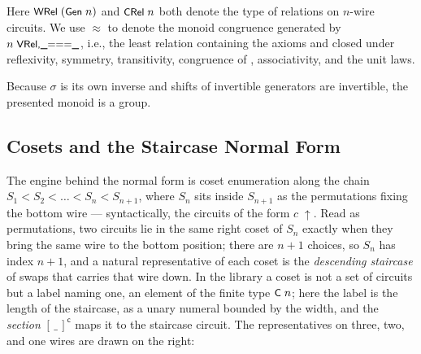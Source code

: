 Here $\mbox{\textsf{\small WRel}}\;(\mbox{\textsf{\small Gen}}\;n)$ and $\mbox{\textsf{\small CRel}}\;n$ both denote the
type of relations on $n$-wire circuits.
We use $\approx$ to denote the monoid congruence generated by
$n\;\mbox{\textsf{\small VRel,{\_}==={\_}}}$, i.e., the least relation containing the
axioms and closed under reflexivity, symmetry, transitivity,
congruence of , associativity, and the unit laws.

\iffalse

Because $\sigma$ is its own inverse and shifts of invertible
generators are invertible, the presented monoid is a group.

\subsection{Cosets and the Staircase Normal Form}\label{app:sn-cosets}

The engine behind the normal form is coset enumeration along the chain
$S_1 < S_2 < \dots < S_n < S_{n+1}$, where $S_n$ sits inside $S_{n+1}$ as
the permutations fixing the bottom wire --- syntactically, the circuits
of the form $c\;{\uparrow}$.  Read as permutations, two circuits lie in the
same right coset of $S_n$ exactly when they bring the same wire to the
bottom position; there are $n{+}1$ choices, so $S_n$ has index $n{+}1$,
and a natural representative of each coset is the \emph{descending
staircase} of swaps that carries that wire down.  In the library a coset
is not a set of circuits but a label naming one, an element of the finite type
$\mbox{\textsf{\small C}}\;n$; here the label is the length of the staircase, as a unary
numeral bounded by the width, and the \emph{section} $[\,\_\,]^{\mathsf
c}$ maps it to the staircase circuit.  The representatives on three,
two, and one wires are drawn on the right:

